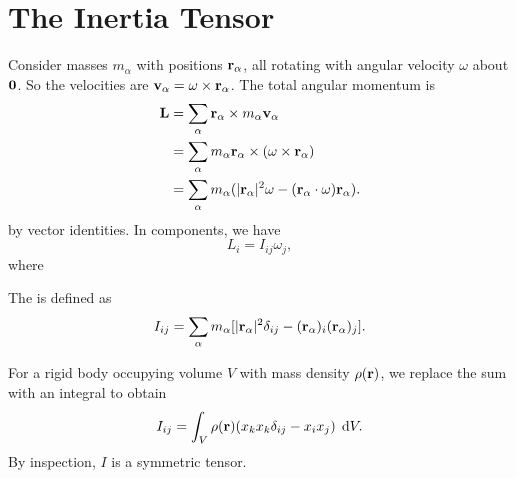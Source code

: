 \section{The Inertia Tensor}
Consider masses $m_\alpha$ with positions $\mathbf{ r}_\alpha$, all rotating with angular velocity $\omega$ about $\mathbf{ 0}$. So the velocities are $\mathbf{ v}_\alpha = \omega\times \mathbf{ r}_\alpha$. The total angular momentum is
\begin{align*}
  \mathbf{ L} &= \sum_{\alpha} \mathbf{ r}_\alpha \times m_\alpha \mathbf{ v}_\alpha \\
  &= \sum_\alpha m_\alpha \mathbf{ r}_\alpha \times (\omega\times \mathbf{ r}_\alpha)\\
  &= \sum_\alpha m_\alpha( |\mathbf{ r}_\alpha|^2\omega - (\mathbf{ r}_\alpha \cdot \omega)\mathbf{ r}_\alpha).
\end{align*}
by vector identities. In components, we have
\[
  L_i = I_{ij}\omega_j,
\]
where
\begin{df}
  The  is defined as
  \[
    I_{ij} = \sum_\alpha m_\alpha [|\mathbf{ r}_\alpha|^2 \delta_{ij} - (\mathbf{ r}_\alpha)_i (\mathbf{ r}_\alpha)_j].
  \]
\end{df}
For a rigid body occupying volume $V$ with mass density $\rho(\mathbf{ r})$, we replace the sum with an integral to obtain
\[
  I_{ij} = \dint_V \rho (\vector{r})(x_kx_k \delta_{ij} - x_i x_j)\;\d V.
\]
By inspection, $I$ is a symmetric tensor.

